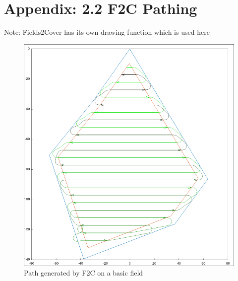 \documentclass[progress]{cmpreport}
\begin{document}
\begin{appendix}
\begin{figure}[H]
		\hfill

	\end{figure}

	\section{Appendix: 2.2 F2C Pathing}
	\label{F2CCCPP}
	Note: Fields2Cover has its own drawing function which is used here

	\begin{figure}[H]
		\centering
		\begin{minipage}[b]{0.75\textwidth}
			\centering
			\includegraphics[width=\textwidth]{images/F2CPath.jpg}
			\caption{Path generated by F2C on a basic field}
		\end{minipage}

		\hfill
		\vspace{1em}


\end{figure}
\end{appendix}
\end{document}
